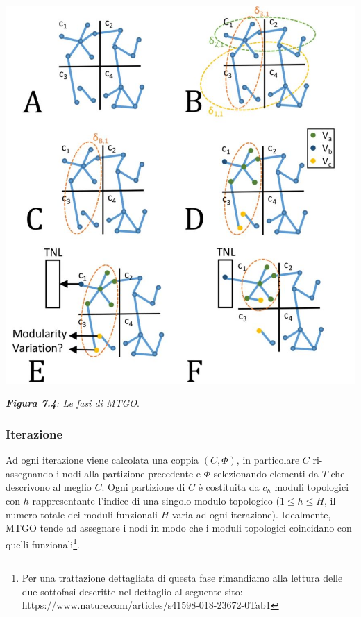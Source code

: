 \documentclass[11pt]{article}
\begin{document}
\begin{center}
\includegraphics[scale=0.6]{MTGO2}

\begin{small}\textit{\textbf{Figura 7.4}: Le fasi di MTGO}.\end{small}
\end{center}

\subsubsection{Iterazione}
Ad ogni iterazione viene calcolata una coppia $(C, \Phi)$, in particolare $C$ ri-assegnando i nodi alla partizione precedente e $\Phi$ selezionando elementi da $T$ che descrivono al meglio $C$. Ogni partizione di $C$ è costituita da $c_h$ moduli topologici con $h$ rappresentante l'indice di una singolo modulo topologico ($1\leq h \leq H$, il numero totale dei moduli funzionali $H$ varia ad ogni iterazione). Idealmente, MTGO tende ad assegnare i nodi in modo che i moduli topologici coincidano con quelli funzionali\footnote{Per una trattazione dettagliata di questa fase rimandiamo alla lettura delle due sottofasi descritte nel dettaglio al seguente sito: https://www.nature.com/articles/s41598-018-23672-0Tab1}.
\end{document}
